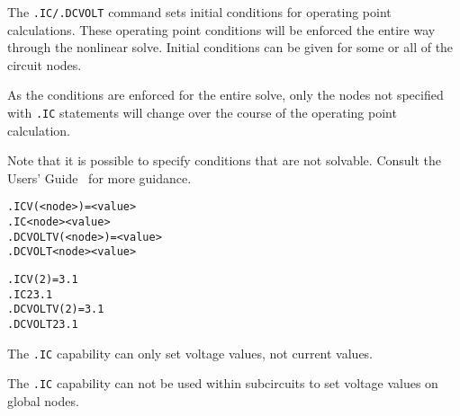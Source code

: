 


\label{IC_section}

The \texttt{.IC/.DCVOLT} command sets initial conditions for operating point calculations.
These operating point conditions will be enforced the entire way through the
nonlinear solve.  Initial conditions can be given for some or all of the
circuit nodes.

As the conditions are enforced for the entire solve, only the nodes not
specified with \texttt{.IC} statements will change over the course of the
operating point calculation.

Note that it is possible to specify conditions that are not solvable.
Consult the \Xyce{} Users' Guide~\UsersGuide{} for more guidance.

\begin{Command}
\format
\begin{alltt}
.IC V(<node>)=<value>
.IC <node> <value>
.DCVOLT V(<node>)=<value>
.DCVOLT <node> <value>
\end{alltt}

\examples
\begin{alltt}
.IC V(2)=3.1
.IC 2 3.1
.DCVOLT V(2)=3.1
.DCVOLT 2 3.1
\end{alltt}

\comments
The \texttt{.IC} capability can only set voltage values, not current values.

The \texttt{.IC} capability can not be used within subcircuits to set
voltage values on global nodes.

\end{Command}

